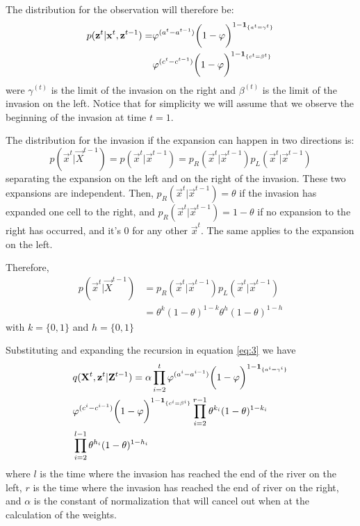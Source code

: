 The distribution for the observation will therefore be:
\begin{align*}
    p(\mathbf{z}^{t} | \mathbf{x}^{t}, \mathbf{z}^{t-1}) = &\varphi^{(a^{t} - a^{t-1})} \bigg(1 - \varphi \bigg)^{1-\mathbf{1}_{\{a^{t}=\gamma^{t}\}}}\\
    &\varphi^{(c^{t} - c^{t-1})} \bigg( 1 - \varphi \bigg)^{1-\mathbf{1}_{\{c^{t}=\beta^{t}\}}}
\end{align*}
were $\gamma^{(t)}$ is the limit of the invasion on the right and $\beta^{(t)}$ is the limit of the invasion on the left.
Notice that for simplicity we will assume that we observe the beginning of the invasion at time $t=1$. 

The distribution for the invasion if the expansion can happen in two directions is:
\begin{equation*}
    p(\vec{x}^{t} | \vec{X}^{t-1}) = p(\vec{x}^{t} | \vec{x}^{t-1}) = p_R(\vec{x}^{t} | \vec{x}^{t-1}) p_L(\vec{x}^{t} | \vec{x}^{t-1}) 
\end{equation*}
separating the expansion on the left and on the right of the invasion.
These two expansions are independent. Then, $p_R(\vec{x}^{t} | \vec{x}^{t-1}) = \theta$ if the invasion has expanded one cell to the right, and $p_R(\vec{x}^{t} | \vec{x}^{t-1}) = 1 - \theta$ if no expansion to the right has occurred, and it's 0 for any other $\vec{x}^{t}$. The same applies to the expansion on the left.

Therefore,
\begin{align*}
       p(\vec{x}^{t} | \vec{X}^{t-1}) &= p_R(\vec{x}^{t} | \vec{x}^{t-1}) p_L(\vec{x}^{t} | \vec{x}^{t-1})\\
       & = \theta^{k} (1-\theta)^{1-k}\theta^{h} (1-\theta)^{1-h} 
\end{align*}
with $k=\{0,1\}$ and $h=\{0,1\}$

Substituting and expanding the recursion in equation \eqref{eq:3} we have
\begin{align*}
        & q(\mathbf{X}^{t},\mathbf{z}^{t} | \mathbf{Z}^{t-1}) = \alpha \prod_{i=2}^{t} \varphi^{(a^{i} - a^{i-1})}\bigg(1 - \varphi \bigg)^{1-\mathbf{1}_{\{a^i=\gamma^i\}}} \\
        & \varphi^{(c^{i} - c^{i-1})} \bigg(1 - \varphi\bigg)^{1-\mathbf{1}_{\{c^i=\beta^i\}}} \prod_{i=2}^{r-1} \theta^{k_i} (1-\theta)^{1-k_i} \\ 
        & \prod_{i=2}^{l-1} \theta^{h_i} (1-\theta)^{1-h_i}
\end{align*}
where $l$ is the time where the invasion has reached the end of the river on the left, $r$ is the time where the invasion has reached the end of river on the right, and $\alpha$ is the constant of normalization that will cancel out when at the calculation of the weights.


